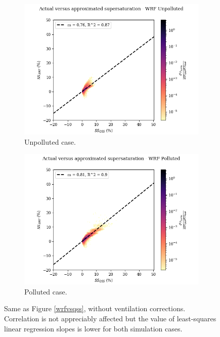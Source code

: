 \documentclass{article}
\begin{document}
\begin{figure}[ht]
	\centering
	\begin{subfigure}{0.7\textwidth}
		\includegraphics[width=\textwidth]{wrf/novent_heatmap_ss_qss_vs_ss_wrf_Unpolluted_figure.png}
		\caption{Unpolluted case.}
		\label{noventwrfvsqssunpoll}
	\end{subfigure}
	\begin{subfigure}{0.7\textwidth}
		\includegraphics[width=\textwidth]{wrf/novent_heatmap_ss_qss_vs_ss_wrf_Polluted_figure.png}
		\caption{Polluted case.}
		\label{noventwrfvsqsspoll}
	\end{subfigure}
	\caption{Same as Figure \ref{wrfvsqss}, without ventilation corrections. Correlation is not appreciably affected but the value of least-squares linear regression slopes is lower for both simulation cases.}
	\label{noventwrfvsqss}
\end{figure}
\end{document}
